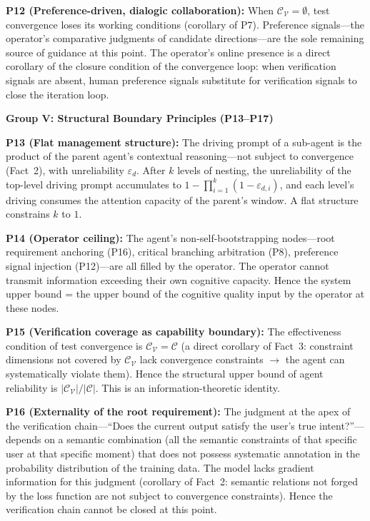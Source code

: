 \documentclass[11pt,a4paper]{article}
\theoremstyle{definition}
\newcommand{\verifspace}{\mathcal{C}_{\mathcal{V}}}
\newcommand{\taskcspace}{\mathcal{C}}
\begin{document}
\textbf{P12 (Preference-driven, dialogic collaboration):} When $\verifspace = \emptyset$, test convergence loses its working conditions (corollary of P7). Preference signals---the operator's comparative judgments of candidate directions---are the sole remaining source of guidance at this point. The operator's online presence is a direct corollary of the closure condition of the convergence loop: when verification signals are absent, human preference signals substitute for verification signals to close the iteration loop.

\medskip
\textbf{Group V: Structural Boundary Principles (P13--P17)}

\textbf{P13 (Flat management structure):} The driving prompt of a sub-agent is the product of the parent agent's contextual reasoning---not subject to convergence (Fact~2), with unreliability $\varepsilon_d$. After $k$ levels of nesting, the unreliability of the top-level driving prompt accumulates to $1 - \prod_{i=1}^k (1-\varepsilon_{d,i})$, and each level's driving consumes the attention capacity of the parent's window. A flat structure constrains $k$ to $1$.

\textbf{P14 (Operator ceiling):} The agent's non-self-bootstrapping nodes---root requirement anchoring (P16), critical branching arbitration (P8), preference signal injection (P12)---are all filled by the operator. The operator cannot transmit information exceeding their own cognitive capacity. Hence the system upper bound = the upper bound of the cognitive quality input by the operator at these nodes.

\textbf{P15 (Verification coverage as capability boundary):} The effectiveness condition of test convergence is $\verifspace = \taskcspace$ (a direct corollary of Fact~3: constraint dimensions not covered by $\verifspace$ lack convergence constraints $\to$ the agent can systematically violate them). Hence the structural upper bound of agent reliability is $|\verifspace|/|\taskcspace|$. This is an information-theoretic identity.

\textbf{P16 (Externality of the root requirement):} The judgment at the apex of the verification chain---``Does the current output satisfy the user's true intent?''---depends on a semantic combination (all the semantic constraints of that specific user at that specific moment) that does not possess systematic annotation in the probability distribution of the training data. The model lacks gradient information for this judgment (corollary of Fact~2: semantic relations not forged by the loss function are not subject to convergence constraints). Hence the verification chain cannot be closed at this point.
\end{document}
